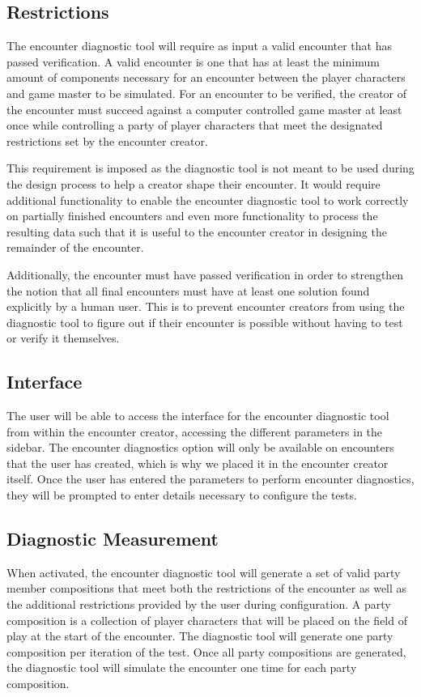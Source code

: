 \documentclass[12pt,a4paper]{report}
\begin{document}
		\subsection{Restrictions}
		The encounter diagnostic tool will require as input a valid encounter that has passed verification. A valid encounter is one that has at least the minimum amount of components necessary for an encounter between the player characters and game master to be simulated. For an encounter to be verified, the creator of the encounter must succeed against a computer controlled game master at least once while controlling a party of player characters that meet the designated restrictions set by the encounter creator.  
		
		This requirement is imposed as the diagnostic tool is not meant to be used during the design process to help a creator shape their encounter. It would require additional functionality to enable the encounter diagnostic tool to work correctly on partially finished encounters and even more functionality to process the resulting data such that it is useful to the encounter creator in designing the remainder of the encounter. 
		
		Additionally, the encounter must have passed verification in order to strengthen the notion that all final encounters must have at least one solution found explicitly by a human user. This is to prevent encounter creators from using the diagnostic tool to figure out if their encounter is possible without having to test or verify it themselves. 
		\subsection{Interface}
		The user will be able to access the interface for the encounter diagnostic tool from within the encounter creator, accessing the different parameters in the sidebar. The encounter diagnostics option will only be available on encounters that the user has created, which is why we placed it in the encounter creator itself. Once the user has entered the parameters to perform encounter diagnostics, they will be prompted to enter details necessary to configure the tests.
		
		\subsection{Diagnostic Measurement}
		When activated, the encounter diagnostic tool will generate a set of valid party member compositions that meet both the restrictions of the encounter as well as the additional restrictions provided by the user during configuration. A party composition is a collection of player characters that will be placed on the field of play at the start of the encounter. The diagnostic tool will generate one party composition per iteration of the test. Once all party compositions are generated, the diagnostic tool will simulate the encounter one time for each party composition. 
		
\end{document}
